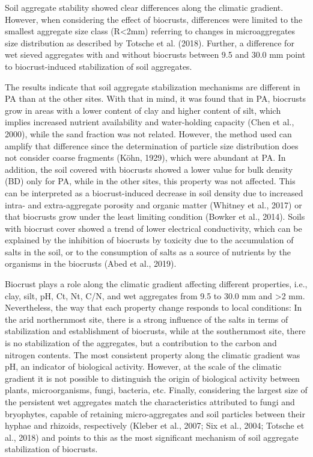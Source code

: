 {Soil aggregate stability showed clear differences along the climatic gradient. However, when considering the effect of biocrusts, differences were limited to the smallest aggregate size class (R<2mm) referring to changes in microaggregates size distribution as described by Totsche et al. (2018). Further, a difference for wet sieved aggregates with and without biocrusts between 9.5 and 30.0 mm point to biocrust-induced stabilization of soil aggregates.

The results indicate that soil aggregate stabilization mechanisms are different in PA than at the other sites. With that in mind, it was found that in PA, biocrusts grow in areas with a lower content of clay and higher content of silt, which implies increased nutrient availability and water-holding capacity (Chen et al., 2000), while the sand fraction was not related. However, the method used can amplify that difference since the determination of particle size distribution does not consider coarse fragments (Köhn, 1929), which were abundant at PA. In addition, the soil covered with biocrusts showed a lower value for bulk density (BD) only for PA, while in the other sites, this property was not affected. This can be interpreted as a biocrust-induced decrease in soil density due to increased intra- and extra-aggregate porosity and organic matter (Whitney et al., 2017) or that biocrusts grow under the least limiting condition (Bowker et al., 2014). Soils with biocrust cover showed a trend of lower electrical conductivity, which can be explained by the inhibition of biocrusts by toxicity due to the accumulation of salts in the soil, or to the consumption of salts as a source of nutrients by the organisms in the biocrusts (Abed et al., 2019).

Biocrust plays a role along the climatic gradient affecting different properties, i.e., clay, silt, pH, Ct, Nt, C/N, and wet aggregates from 9.5 to 30.0 mm and >2 mm. Nevertheless, the way that each property change responds to local conditions: In the arid northernmost site, there is a strong influence of the salts in terms of stabilization and establishment of biocrusts, while at the southernmost site, there is no stabilization of the aggregates, but a contribution to the carbon and nitrogen contents. The most consistent property along the climatic gradient was pH, an indicator of biological activity. However, at the scale of the climatic gradient it is not possible to distinguish the origin of biological activity between plants, microorganisms, fungi, bacteria, etc. Finally, considering the largest size of the persistent wet aggregates match the characteristics attributed to fungi and bryophytes, capable of retaining micro-aggregates and soil particles between their hyphae and rhizoids, respectively (Kleber et al., 2007; Six et al., 2004; Totsche et al., 2018) and points to this as the most significant mechanism of soil aggregate stabilization of biocrusts.

}
